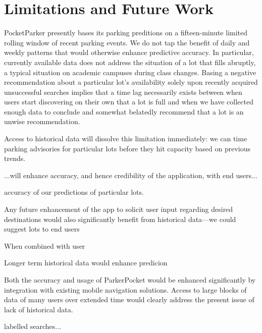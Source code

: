 \section{Limitations and Future Work}
\label{sec-future}



PocketParker presently bases its parking preditions on a fifteen-minute 
limited rolling window of recent parking events. We do not tap the benefit
of daily and weekly patterns that would otherwise enhance predictive accuracy.
In particular, currently available data does not address the situation of a
lot that fills abruptly, a typical situation on academic campuses during
class changes. Basing a negative recommendation about a particular lot's
availability solely upon recently acquired unsuccessful searches implies
that a time lag necessarily exists between when users start discovering on
their own that a lot is full and when we have collected enough data to
conclude and somewhat belatedly recommend that a lot is an unwise
recommendation.

Access to historical data will dissolve this limitation immediately:  we can
time parking advisories for particular lots before they hit capacity based on
previous trends.


...will enhance accuracy, and hence credibility of the application, with end users...

accuracy of our predictions of particular lots.

Any future enhancement of the app to solicit user input regarding desired
destinations would also significantly benefit from historical data---we
could suggest lots to end users 

When combined with user

Longer term historical data
would enhance predicion




Both the accuracy and usage of ParkerPocket would be enhanced significantly
by integration with existing mobile navigation solutions.  Access to large blocks of data of many users over extended time
would clearly address the present issue of lack of historical data.


labelled searches...







